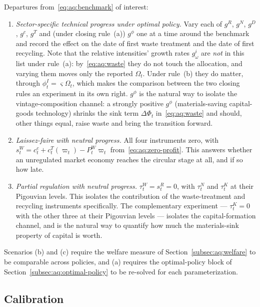  Departures from~\eqref{eq:aq:benchmark} of interest:
\begin{enumerate}[label=(\alph*),leftmargin=2.4em]
\item \emph{Sector-specific technical progress under optimal policy.} Vary each of $g^R$, $g^N$, $g^D$, $g^c$, $g^T$ and (under closing rule~(a)) $g^\phi$ one at a time around the benchmark and record the effect on the date of first waste treatment and the date of first recycling. Note that the relative intensities' growth rates $g^i_\omega$ are \emph{not} in this list under rule~(a): by~\eqref{eq:aq:waste} they do not touch the allocation, and varying them moves only the reported $\Omega_t$. Under rule~(b) they do matter, through $\phi^I_t=\varsigma\Omega_t$, which makes the comparison between the two closing rules an experiment in its own right. $g^\phi$ is the natural way to isolate the vintage-composition channel: a strongly positive $g^\phi$ (materials-saving capital-goods technology) shrinks the sink term $\Delta\Phi_t$ in~\eqref{eq:aq:waste} and should, other things equal, raise waste and bring the transition forward.
\item \emph{Laissez-faire with neutral progress.} All four instruments zero, with $s^W_t=c^c_t+c^T_t(\varpi_t)-P^W_t\varpi_t$ from~\eqref{eq:aq:zero-profit}. This answers whether an unregulated market economy reaches the circular stage at all, and if so how late.
\item \emph{Partial regulation with neutral progress.} $\tau^W_t=s^R_t=0$, with $\tau^N_t$ and $\tau^K_t$ at their Pigouvian levels. This isolates the contribution of the waste-treatment and recycling instruments specifically. The complementary experiment --- $\tau^K_t=0$ with the other three at their Pigouvian levels --- isolates the capital-formation channel, and is the natural way to quantify how much the materials-sink property of capital is worth.
\end{enumerate}
Scenarios (b) and (c) require the welfare measure of Section~\ref{subsec:aq:welfare} to be comparable across policies, and (a) requires the optimal-policy block of Section~\ref{subsec:aq:optimal-policy} to be re-solved for each parameterization.

\subsection{Calibration}
\label{subsec:aq:calibration}

